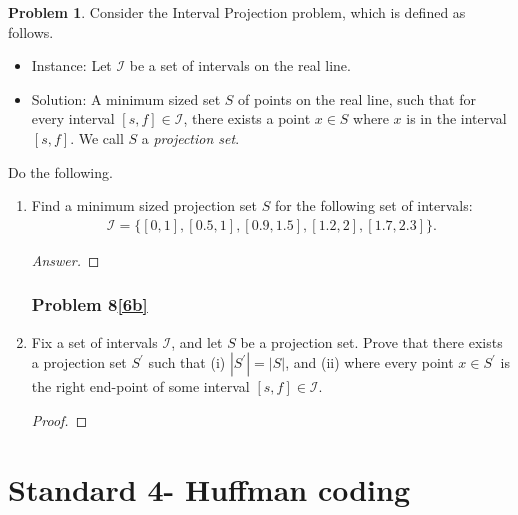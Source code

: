 \documentclass[11pt]{article}
\theoremstyle{definition}
\theoremstyle{definition}
\newtheorem{required}{Problem}
\theoremstyle{definition}
\begin{document}
\begin{required} \label{Exchange2}
Consider the \textsf{Interval Projection} problem, which is defined as follows.
\begin{itemize}
\item \textsf{Instance:} Let $\mathcal{I}$ be a set of intervals on the real line.
\item \textsf{Solution:} A minimum sized set $S$ of points on the real line, such that for every interval $[s, f] \in \mathcal{I}$, there exists a point $x \in S$ where $x$ is in the interval $[s, f]$. We call $S$ a \textit{projection set}.
\end{itemize}

\noindent Do the following.
\begin{enumerate}[label=(\alph*)]
\subsubsection{Problem 8\ref{6a}}
\item \label{6a} Find a minimum sized projection set $S$ for the following set of intervals:
\begin{align*}
\mathcal{I} = \{ [0, 1], [0.5, 1], [0.9, 1.5], [1.2, 2], [1.7, 2.3] \}.
\end{align*}


\begin{proof}[Answer]
\end{proof}

\newpage
\subsubsection{Problem 8\ref{6b}}
\item \label{6b} Fix a set of intervals $\mathcal{I}$, and let $S$ be a projection set. Prove that there exists a projection set $S^{\prime}$ such that (i) $|S^{\prime}| = |S|$, and (ii) where every point $x \in S^{\prime}$ is the right end-point of some interval $[s, f] \in \mathcal{I}$. 

\begin{proof}
\end{proof}

\end{enumerate}
\end{required}

\newpage
\section{Standard 4- Huffman coding}
\end{document}
